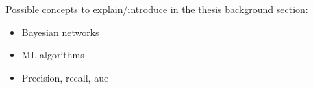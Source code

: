 \documentclass{article}
\begin{document}
Possible concepts to explain/introduce in the thesis background section:
\begin{itemize}
    \item Bayesian networks
    \item ML algorithms
    \item Precision, recall, auc
\end{itemize}

\nocite{*}


\end{document}
